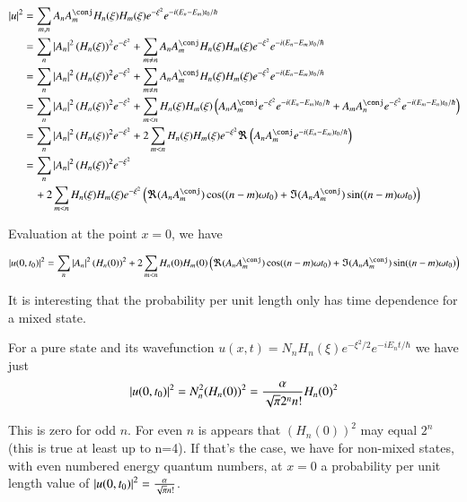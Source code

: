 \begin{align*}
\Abs{u}^2
&=
\sum_{m,n}
A_n A_m^\conj H_n(\xi) H_m(\xi) e^{-\xi^2} e^{-i (E_n - E_m)t_0/\hbar} \\
&=
\sum_n
\Abs{A_n}^2 (H_n(\xi))^2 e^{-\xi^2}
+\sum_{m \ne n}
A_n A_m^\conj H_n(\xi) H_m(\xi) e^{-\xi^2} e^{-i (E_n - E_m)t_0/\hbar} \\
&=
\sum_n
\Abs{A_n}^2 (H_n(\xi))^2 e^{-\xi^2}
+\sum_{m \ne n}
A_n A_m^\conj H_n(\xi) H_m(\xi) e^{-\xi^2} e^{-i (E_n - E_m)t_0/\hbar} \\
&=
\sum_n
\Abs{A_n}^2 (H_n(\xi))^2 e^{-\xi^2}
+\sum_{m < n}
H_n(\xi) H_m(\xi)
\left(
A_n A_m^\conj
e^{-\xi^2} e^{-i (E_n - E_m)t_0/\hbar}
+A_m A_n^\conj
e^{-\xi^2} e^{-i (E_m - E_n)t_0/\hbar}
\right) \\
&=
\sum_n
\Abs{A_n}^2 (H_n(\xi))^2 e^{-\xi^2}
+2 \sum_{m < n}
H_n(\xi) H_m(\xi)
e^{-\xi^2}
\Re \left(
A_n A_m^\conj
e^{-i (E_n - E_m)t_0/\hbar}
\right) \\
&=
\sum_n
\Abs{A_n}^2 (H_n(\xi))^2 e^{-\xi^2}  \\
&\quad+2 \sum_{m < n}
H_n(\xi) H_m(\xi)
e^{-\xi^2}
\left(
\Re ( A_n A_m^\conj ) \cos( (n - m)\omega t_0)
+\Im ( A_n A_m^\conj ) \sin( (n - m)\omega t_0)
\right) \\
\end{align*}

Evaluation at the point $x = 0$, we have

\begin{equation}\label{eqn:qmIproblemSet5:500}
\Abs{u(0,t_0)}^2
=
\sum_n
\Abs{A_n}^2 (H_n(0))^2 +2 \sum_{m < n} H_n(0) H_m(0) \left( \Re ( A_n A_m^\conj ) \cos( (n - m)\omega t_0) +\Im ( A_n A_m^\conj ) \sin( (n - m)\omega t_0)
\right)
\end{equation}

It is interesting that the probability per unit length only has time dependence for a mixed state.

For a pure state and its wavefunction $u(x,t) = N_n H_n(\xi) e^{-\xi^2/2} e^{-i E_n t/\hbar}$ we have just
\begin{equation}\label{eqn:qmIproblemSet5:510}
\left\lvert{u(0,t_0)}\right\rvert^2
=
N_n^2 (H_n(0))^2 = \frac{\alpha}{\sqrt{\pi} 2^n n!} H_n(0)^2
\end{equation}

This is zero for odd $n$.  For even $n$ is appears that $(H_n(0))^2$ may equal $2^n$ (this is true at least up to n=4).  If that's the case, we have for non-mixed states, with even numbered energy quantum numbers, at $x=0$ a probability per unit length value of $\left\lvert{u(0,t_0)}\right\rvert^2 = \frac{\alpha}{\sqrt{\pi} n!}$.

